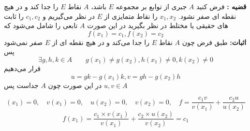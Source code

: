 \documentclass[12pt]{report}
\begin{document}
 \textbf{قضیه :}
 فرض کنید 
 $A$
 جبری از توابع بر مجموعه 
 $E$
 باشد، 
 $A$
 نقاط 
 $E$
 را جدا کند و در هیچ نقطه ای صفر نشود.
 $x_1 , x_2$
  را نقاط متمایزی از 
  $E$
  در نظر می‌گیریم  و 
  $c_1, c_2$
  را ثابت های حقیقی یا مختلط در نظر بگیرید در این صورت
  $A$
  تابعی را شامل می‌شود که
  \[
  f(x_1) = c_1 , f(x_2) = c_2
  \] 
  \textbf{اثبات:}
  طبق فرض  چون 
  $A$
  نقاط 
  $E$
  را جدا می‌کند و در هیچ نقطه ای از 
  $E$
  صفر نمی‌شود پس
  \[
  \exists g , h , k \in A \qquad g(x_1) \neq g(x_2) , h(x_1) \neq 0 , k(x_2) \neq 0
  \]
  قرار می‌دهیم
  \[
  u = gk - g(x_1)k , v = gh - g(x_2)h
  \]
  در این صورت چون 
  $A$
  جداست پس
  $ u , v \in A$
  
  \[(x_1) = 0 , \quad v(x_1) = 0 , \quad u(x_2) = 0 , \quad v(x_2) = 0  , \quad f = \frac{c_1v}{v(x_1)} +\frac{c_2u}{u(x_2)}
  \]
  \[
  f(x_1) = \frac{c_1 \times v(x_1)}{v(x_1)} + \frac{c_2 \times u(x_2)}{v(x_2)} = c_1
  \]
  




 
\end{document}
